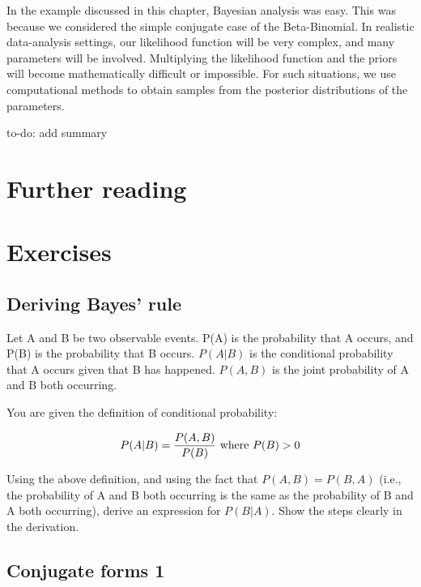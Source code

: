 \documentclass[12pt,]{krantz}
\let\BeginKnitrBlock\begin \let\EndKnitrBlock\end
\begin{document}
In the example discussed in this chapter, Bayesian analysis was easy. This was because we considered the simple conjugate case of the Beta-Binomial. In realistic data-analysis settings, our likelihood function will be very complex, and many parameters will be involved. Multiplying the likelihood function and the priors will become mathematically difficult or impossible. For such situations, we use computational methods to obtain samples from the posterior distributions of the parameters.

\BeginKnitrBlock{rmdnote}
to-do: add summary
\EndKnitrBlock{rmdnote}

\hypertarget{further-reading-1}{%
\section{Further reading}\label{further-reading-1}}

\hypertarget{exercises-1}{%
\section{Exercises}\label{exercises-1}}

\hypertarget{deriving-bayes-rule}{%
\subsection{Deriving Bayes' rule}\label{deriving-bayes-rule}}

Let A and B be two observable events. P(A) is the probability that A occurs, and P(B) is the probability that B occurs. \(P(A|B)\) is the conditional probability that A occurs given that B has happened. \(P(A,B)\) is the joint probability of A and B both occurring.

You are given the definition of conditional probability:

\begin{equation}
P(A|B)= \frac{P(A,B)}{P(B)} \hbox{ where } P(B)>0
\end{equation}

Using the above definition, and using the fact that \(P(A,B)=P(B,A)\) (i.e., the probability of A and B both occurring is the same as the probability of B and A both occurring),
derive an expression for \(P(B|A)\). Show the steps clearly in the derivation.

\hypertarget{conjugate-forms-1}{%
\subsection{Conjugate forms 1}\label{conjugate-forms-1}}
\end{document}
